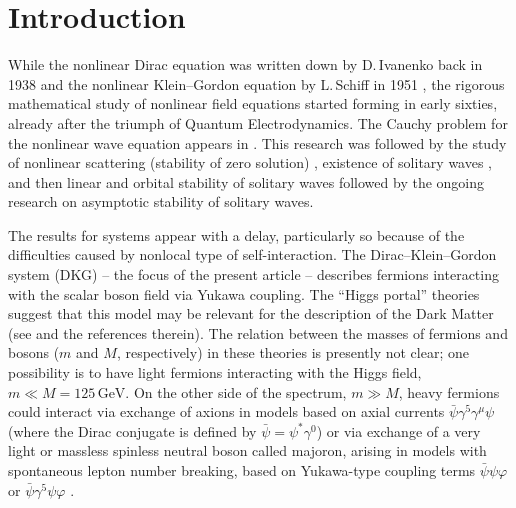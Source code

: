 \documentclass[12pt]{extarticle}
\theoremstyle{plain}
\theoremstyle{remark}
\begin{document}
\setlength{\cftbeforesecskip}{5pt}
\tableofcontents

\section{Introduction}

While the nonlinear Dirac equation
was written down by D.\,Ivanenko back in
1938 \cite{jetp.8.260}
and the nonlinear Klein--Gordon equation
by L.\,Schiff
in 1951 \cite{PhysRev.84.1,PhysRev.84.10},
the rigorous mathematical study
of nonlinear field equations
started forming in early sixties, already after
the triumph of Quantum Electrodynamics.
The Cauchy problem for the nonlinear wave equation
appears in \cite{jorgens1961anfangswertproblem,segal1963global}.
This research was followed by the study of
nonlinear scattering
(stability of zero solution)
\cite{MR0217453,MR0233062,MR0303097},
existence of solitary waves
\cite{strauss1977existence,berestycki1983nonlinear,cazenave1986existence,esteban1996stationary},
and then linear and orbital
stability of solitary waves
\cite{zakharov-1967,kolokolov-1973,cazenave1982orbital,grillakis1987stability} followed by the ongoing research on asymptotic stability
of solitary waves.

The results for systems
appear with a delay,
particularly so
because of the difficulties caused by
nonlocal type of self-interaction.
The Dirac--Klein--Gordon system
(DKG) -- the focus of the present article --
describes
fermions interacting with the
scalar boson field
via Yukawa coupling.
The ``Higgs portal''
theories suggest that this model
may be relevant for the description
of the Dark Matter
(see \cite{comech2025stable} and the references therein).
The relation
between the masses
of fermions and
bosons ($m$ and $M$, respectively)
in these theories
is presently not clear;
one possibility is to have light
fermions
interacting with the
Higgs field,
$m\ll M=125\,\mathrm{GeV}$.
On the other side of the spectrum,
$m\gg M$,
heavy fermions
could interact via exchange of
axions
in models based on axial currents
$\bar\psi\gamma^5\gamma^\mu\psi$
(where the Dirac conjugate is defined by
$\bar\psi=\psi^*\gamma^0$)
or via exchange of 
a
very light or massless spinless neutral boson
called majoron,
arising in models with spontaneous lepton number breaking,
based on Yukawa-type coupling terms
$\bar\psi\psi \varphi$
or $\bar\psi\gamma^5\psi \varphi$
\cite{lessa2007revisiting}.
\end{document}

